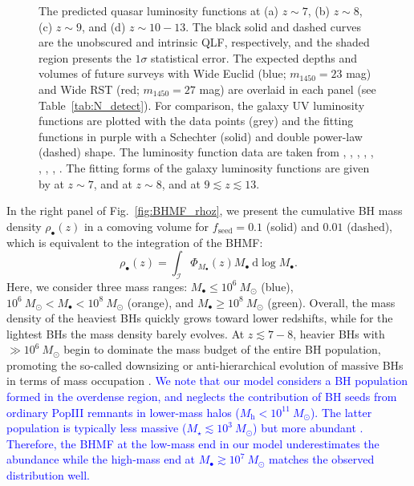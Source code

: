 \documentclass[twocolumn, twocolappendix]{aastex63}
\newcommand{\Msun}{M_\odot}
\newcommand{\Mh}{M_\mathrm{h}}
\newcommand{\Mbh}{M_\bullet}
\newcommand{\fseed}{f_\mathrm{seed}}
\newcommand{\D}{\mathrm{d}}
\newcommand{\blue}[1]{\textcolor{blue}{ #1}}
\begin{document}
\begin{CJK*}{UTF8}{gbsn}
\begin{figure}
\caption{
The predicted quasar luminosity functions at (a) $z\sim 7$, (b) $z\sim 8$, (c) $z\sim 9$, and (d) $z\sim 10-13$.
The black solid and dashed curves are the unobscured and intrinsic QLF, respectively, and the shaded region presents the $1\sigma$ statistical error.
The expected depths and volumes of future surveys with Wide Euclid (blue; $m_{1450}= 23$ mag) and Wide RST (red; $m_{1450}= 27$ mag) are overlaid in each panel (see Table~\ref{tab:N_detect}).
For comparison, the galaxy UV luminosity functions are plotted with the data points (grey) and the fitting functions in purple with a Schechter (solid) and double power-law (dashed) shape.
The luminosity function data are taken from \citet{2013MNRAS.432.2696M}, \citet{2016ApJ...819..129O}, \citet{2018ApJ...867..150M},
\citet{2019ApJ...883...99S}, \citet{2020MNRAS.493.2059B}, \citet{2021AJ....162...47B},
\citet{2022ApJS..259...20H,Harikane_2022b,Harikane_2022c}, \citet{2023MNRAS.518.6011D}, \citet{2022ApJ...940L..14N}.
The fitting forms of the galaxy luminosity functions are given by \citet{2022ApJS..259...20H} at $z\sim 7$, 
\citet{2020MNRAS.493.2059B} and \citet{2013MNRAS.432.2696M} at $z\sim 8$, and \citet{Harikane_2022c} at $9\lesssim z\lesssim 13$.}
\label{fig:LFs}
\vspace{5mm}
\end{figure}



In the right panel of Fig.~\ref{fig:BHMF_rhoz}, we present the cumulative BH mass density $\rho_\bullet(z)$ in a comoving volume
for $\fseed=0.1$ (solid) and $0.01$ (dashed),
which is equivalent to the integration of the BHMF:
%
\begin{equation}
 \rho_\bullet(z)=\int_{\mathcal{I}} \Phi_{\Mbh} (z) \Mbh ~\D \log \Mbh.
\end{equation}
%
Here, we consider three mass ranges: $M_\bullet \leq 10^6~\Msun$ (blue), $10^6~\Msun < M_\bullet < 10^8~\Msun$ (orange),
and $M_\bullet \geq 10^8~\Msun$ (green).
Overall, the mass density of the heaviest BHs quickly grows toward lower redshifts,
while for the lightest BHs the mass density barely evolves.
At $z\lesssim 7-8$, heavier BHs with $\gg 10^6~\Msun$ begin to dominate the mass budget of the entire BH population,
promoting the so-called downsizing or anti-hierarchical evolution of massive BHs 
in terms of mass occupation \citep[e.g.,][]{2014ApJ...786..104U}.
\blue{
We note that our model considers a BH population formed in the overdense region,
and neglects the contribution of BH seeds from ordinary PopIII remnants in lower-mass halos ($\Mh<10^{11}~\Msun$).
The latter population is typically less massive ($M_\star \lesssim 10^3~\Msun$) but more abundant \citep[e.g.,][]{2015MNRAS.448..568H,2023MNRAS.518.1601T}.
Therefore, the BHMF at the low-mass end in our model underestimates the abundance while
the high-mass end at $M_\bullet \gtrsim 10^7~\Msun$ matches the observed distribution well.
}




\end{CJK*}
\end{document}
